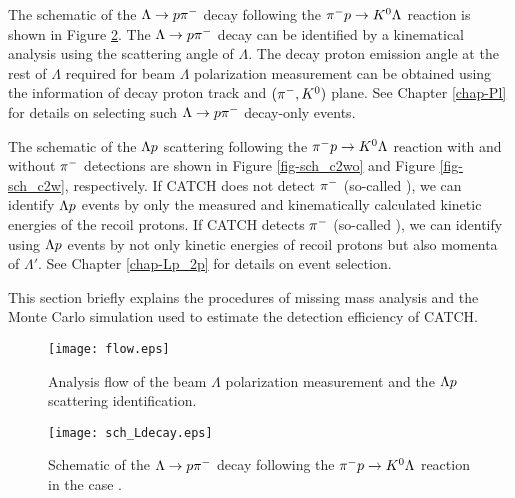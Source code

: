 The schematic of the $\Lambda\to p\pi^{-}$ decay following the $\pi^- p \to K^0 \Lambda$ reaction is shown in Figure \ref{fig-sch_Ldecay}. The $\Lambda\to p\pi^{-}$ decay can be identified by a kinematical analysis using the scattering angle of $\Lambda$. The decay proton emission angle at the rest of $\Lambda$ required for beam $\Lambda$ polarization measurement can be obtained using the information of decay proton track and $(\pi^-,K^0)$ plane. See Chapter \ref{chap-Pl} for details on selecting such $\Lambda\to p\pi^{-}$ decay-only events.

The schematic of the $\Lambda p$ scattering following the $\pi^- p \to K^0 \Lambda$ reaction with and without $\pi^{-}$ detections are shown in Figure \ref{fig-sch_c2wo} and Figure \ref{fig-sch_c2w}, respectively. If CATCH does not detect $\pi^{-}$ (so-called ), we can identify $\Lambda p$ events by only the measured and kinematically calculated kinetic energies of the recoil protons. If CATCH detects $\pi^{-}$ (so-called ), we can identify using $\Lambda p$ events by not only kinetic energies of recoil protons but also momenta of $\Lambda'$. See Chapter \ref{chap-Lp_2p} for details on event selection.

This section briefly explains the procedures of missing mass analysis and the Monte Carlo simulation used to estimate the detection efficiency of CATCH.

\begin{figure}[!h]
  \begin{center}
    \texttt{[image: flow.eps]}
    \caption{Analysis flow of the beam $\Lambda$ polarization measurement and the $\Lambda p$ scattering identification.}
    \label{fig-flow}
  \end{center}
\end{figure}

\begin{figure}[!h]
  \begin{center}
    \texttt{[image: sch\_Ldecay.eps]}
    \caption{Schematic of the $\Lambda\to p\pi^{-}$ decay following the $\pi^- p \to K^0 \Lambda$ reaction in the case .}
    \label{fig-sch_Ldecay}
  \end{center}
\end{figure}

